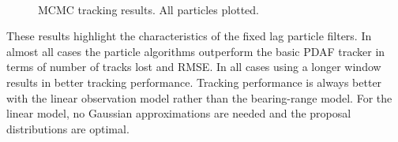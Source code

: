 \begin{figure} \centering
{}
 \\
\caption{MCMC tracking results. All particles plotted.}%
\label{fig:Tracking_MCMC}%
\end{figure}

These results highlight the characteristics of the fixed lag particle filters. In almost all cases the particle algorithms outperform the basic PDAF tracker in terms of number of tracks lost and RMSE. In all cases using a longer window results in better tracking performance. Tracking performance is always better with the linear observation model rather than the bearing-range model. For the linear model, no Gaussian approximations are needed and the proposal distributions are optimal.

